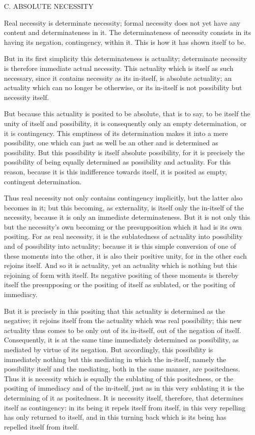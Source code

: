 C. ABSOLUTE NECESSITY

Real necessity is determinate necessity;
formal necessity does not yet have any content and determinateness in it.
The determinateness of necessity consists in
its having its negation, contingency, within it.
This is how it has shown itself to be.

But in its first simplicity this determinateness is actuality;
determinate necessity is therefore immediate actual necessity.
This actuality which is itself as such necessary,
since it contains necessity as its in-itself, is absolute actuality;
an actuality which can no longer be otherwise,
or its in-itself is not possibility but necessity itself.

But because this actuality is posited to be absolute,
that is to say, to be itself the unity of itself and possibility,
it is consequently only an empty determination, or it is contingency.
This emptiness of its determination makes it into a mere possibility,
one which can just as well be an other and is determined as possibility.
But this possibility is itself absolute possibility,
for it is precisely the possibility of being
equally determined as possibility and actuality.
For this reason, because it is this indifference towards itself,
it is posited as empty, contingent determination.

Thus real necessity not only contains contingency implicitly,
but the latter also becomes in it;
but this becoming, as externality,
is itself only the in-itself of the necessity,
because it is only an immediate determinateness.
But it is not only this but the necessity's own becoming
or the presupposition which it had is its own positing.
For as real necessity, it is the sublatedness
of actuality into possibility and of possibility into actuality;
because it is this simple conversion of one of these moments into the other,
it is also their positive unity, for in the other each rejoins itself.
And so it is actuality, yet an actuality
which is nothing but this rejoining of form with itself.
Its negative positing of these moments is thereby itself the presupposing
or the positing of itself as sublated, or the positing of immediacy.

But it is precisely in this positing that
this actuality is determined as the negative;
it rejoins itself from the actuality which was real possibility;
this new actuality thus comes to be only out of its in-itself,
out of the negation of itself.
Consequently, it is at the same time immediately determined
as possibility, as mediated by virtue of its negation.
But accordingly, this possibility is immediately nothing but
this mediating in which the in-itself,
namely the possibility itself and the mediating,
both in the same manner, are positedness.
Thus it is necessity which is equally the sublating of this positedness,
or the positing of immediacy and of the in-itself,
just as in this very sublating it is the determining of it as positedness.
It is necessity itself, therefore, that determines itself as contingency:
in its being it repels itself from itself,
in this very repelling has only returned to itself,
and in this turning back which is its being has repelled itself from itself.

